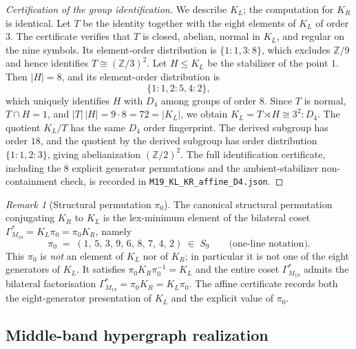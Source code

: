\documentclass[11pt,a4paper]{article}
\theoremstyle{definition}
\theoremstyle{remark}
\newtheorem{remark}[theorem]{Remark}
\providecommand{\Z}{\mathbb{Z}}
\newcommand{\KL}{K_L}
\newcommand{\KR}{K_R}
\begin{document}
\begin{proof}[Certification of the group identification]
We describe $\KL$; the computation for $\KR$ is identical. Let
$T$ be the identity together with the eight elements of $\KL$ of
order $3$. The certificate verifies that $T$ is closed, abelian,
normal in $\KL$, and regular on the nine symbols. Its element-order
distribution is $\{1\!:\!1,3\!:\!8\}$, which excludes $\Z/9$ and hence
identifies $T \cong (\Z/3)^2$. Let $H \le \KL$ be the stabilizer of the point
$1$. Then $|H|=8$, and its element-order distribution is
\begin{equation*}
   \{1\!:\!1,
     2\!:\!5,
     4\!:\!2\},
\end{equation*}
which uniquely identifies $H$ with $D_4$ among groups of order $8$.
Since $T$ is normal, $T \cap H = 1$, and $|T|\,|H| = 9\cdot 8 = 72
= |\KL|$, we obtain $\KL = T \rtimes H \cong 3^2{:}D_4$. The quotient
$\KL/T$ has the same $D_4$ order fingerprint. The derived subgroup has
order $18$, and the quotient by the derived subgroup has order
distribution $\{1\!:\!1,2\!:\!3\}$, giving abelianization
$(\Z/2)^2$. The full identification certificate, including the
$8$ explicit generator permutations and the ambient-stabilizer
non-containment check, is recorded in
\texttt{M19\_KL\_KR\_affine\_D4.json}.
\end{proof}

\begin{remark}[Structural permutation $\pi_0$]\label{rem:pi0}
The canonical structural permutation conjugating $\KR$ to $\KL$ is
the lex-minimum element of the bilateral coset $\Gamma^{*}_{M_{19}}
= \KL \pi_0 = \pi_0 \KR$, namely
\begin{equation}\label{eq:pi0-perm}
   \pi_0 \;=\; (1,\, 5,\, 3,\, 9,\, 6,\, 8,\, 7,\, 4,\, 2)
   \;\in\; S_9
   \qquad\text{(one-line notation).}
\end{equation}
This $\pi_0$ is \emph{not} an element of $\KL$ nor of $\KR$; in
particular it is not one of the eight generators of $\KL$. It satisfies
$\pi_0 \KR \pi_0^{-1} = \KL$ and the entire coset
$\Gamma^{*}_{M_{19}}$ admits the bilateral factorisation
$\Gamma^{*}_{M_{19}} = \pi_0 \KR = \KL \pi_0$. The affine certificate
records both the eight-generator presentation of $\KL$ and the explicit
value of $\pi_0$.
\end{remark}

\subsection{Middle-band hypergraph realization}\label{sec:M19-hypergraph}
\end{document}
